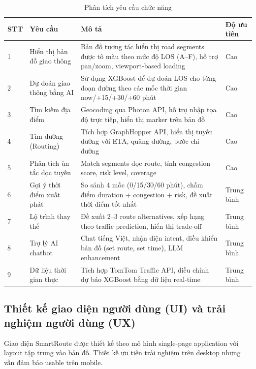 \documentclass[12pt,a4paper]{article}
\begin{document}
\begin{table}[H]
\centering
\caption{Phân tích yêu cầu chức năng}
\begin{tabularx}{\textwidth}{p{0.6cm}L{3cm}Yp{1.8cm}}
\toprule
\textbf{STT} & \textbf{Yêu cầu} & \textbf{Mô tả} & \textbf{Độ ưu tiên} \\
 & Hiển thị bản đồ giao thông & Bản đồ tương tác hiển thị road segments được tô màu theo mức độ LOS (A--F), hỗ trợ pan/zoom, viewport-based loading & Cao \\[4pt]
2 & Dự đoán giao thông bằng AI & Sử dụng XGBoost để dự đoán LOS cho từng đoạn đường theo các mốc thời gian now/+15/+30/+60 phút & Cao \\[4pt]
3 & Tìm kiếm địa điểm & Geocoding qua Photon API, hỗ trợ nhập tọa độ trực tiếp, hiển thị marker trên bản đồ & Cao \\[4pt]
4 & Tìm đường (Routing) & Tích hợp GraphHopper API, hiển thị tuyến đường với ETA, quãng đường, bước chỉ đường & Cao \\[4pt]
5 & Phân tích ùn tắc dọc tuyến & Match segments dọc route, tính congestion score, risk level, coverage & Cao \\[4pt]
6 & Gợi ý thời điểm xuất phát & So sánh 4 mốc (0/15/30/60 phút), chấm điểm duration + congestion + risk, đề xuất thời điểm tốt nhất & Trung bình \\[4pt]
7 & Lộ trình thay thế & Đề xuất 2--3 route alternatives, xếp hạng theo traffic prediction, hiển thị trade-off & Trung bình \\[4pt]
8 & Trợ lý AI chatbot & Chat tiếng Việt, nhận diện intent, điều khiển bản đồ (set route, set time), LLM enhancement & Trung bình \\[4pt]
9 & Dữ liệu thời gian thực & Tích hợp TomTom Traffic API, điều chỉnh dự báo XGBoost bằng dữ liệu real-time & Trung bình \\
\bottomrule
\end{tabularx}
\end{table}

\subsection{Thiết kế giao diện người dùng (UI) và trải nghiệm người dùng (UX)}
Giao diện SmartRoute được thiết kế theo mô hình single-page application với layout tập trung vào bản đồ. Thiết kế ưu tiên trải nghiệm trên desktop nhưng vẫn đảm bảo usable trên mobile.
\end{document}

